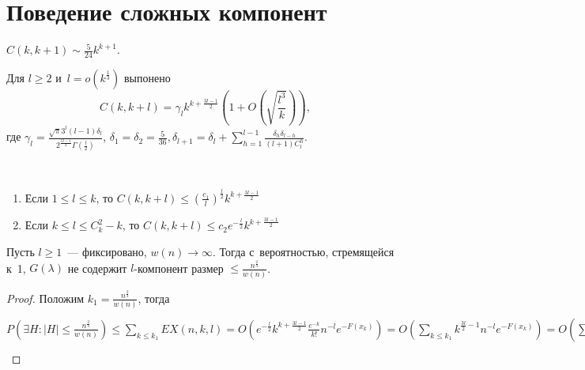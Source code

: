 \documentclass{article}
\begin{document}
\section{Поведение сложных компонент}

\begin{theorem}[Багаев]
	$C(k, k + 1) \sim \frac{5}{24} k^{k+1}$.
\end{theorem}

\begin{theorem}[Райт, 1980]
	Для $l \ge 2$ и~$l = o(k^\frac{1}{3})$ выпонено
	$$C(k, k + l) = \gamma_l k^{k + \frac{3l - 1}{2}} \left(1 +
	O\left(\sqrt{\frac{l^3}{k}}\right)\right),$$
	где
	$\gamma_l = \frac{\sqrt{\pi} 3^l (l - 1) \delta_l}{2^\frac{5l-1}{2} \Gamma(\frac{l}{2})}$,
	$\delta_1 = \delta_2 = \frac{5}{36}, \delta_{l+1} = \delta_l + \sum\limits_{h=1}^{l-1}
	\frac{\delta_h \delta_{l-h}}{(l+1)C_l^h}$.
\end{theorem}

\begin{theorem}[Боллобаш]~
	\begin{enumerate}
		\item Если $1 \le l \le k$, то $C(k, k + l) \le \left(\frac{c_1}{l}\right)^{\frac{l}{2}}
			k^{k + \frac{3l - 1}{2}}$
		\item Если $k \le l \le C_k^2 - k$, то $C(k, k + l) \le c_2 e^{-\frac{l}{2}} k^{k + \frac{3l -
			1}{2}}$
	\end{enumerate}
\end{theorem}

\begin{lemma}
	Пусть $l \ge 1$~--- фиксировано, $w(n) \rightarrow \infty$. Тогда с~вероятностью, стремящейся к~1,
	$G(\lambda)$ не содержит $l$-компонент размер $\le \frac{n^\frac{2}{3}}{w(n)}$.
\end{lemma}
\begin{proof}
	Положим $k_1 = \frac{n^\frac{2}{3}}{w(n)}$, тогда $P(\exists H: |H| \le
	\frac{n^\frac{2}{3}}{w(n)}) \le \sum\limits_{k \le k_1} EX(n, k, l) = O\left( e^{-\frac{l}{2}}
	k^{k + \frac{3l - 1}{2}} \frac{e^{-k}}{k!} n^{-l} e^{-F(x_k)}\right) = O\left(\sum \limits_{k \le
	k_1} k^{\frac{3l}{2} - 1} n^{-l} e^{-F(x_k)}\right) = O\left( \sum\limits_{k \le k_1}
	x_k^{\frac{3l}{2} - 1} n^{l - \frac{2}{3}} n^{-l} e^{-F(x_k)}\right) = O\left( \sum\limits_{k \le
	k_1} x_k^{\frac{3l}{2} - 1} \delta x_k e^{-F(x_k)}\right) = O\left( \int\limits_0^\frac{1}{w(n)}
	x^{\frac{3l}{2}-1} e^{-F(x)} dx\right) \rightarrow 0$
\end{proof}
\end{document}
